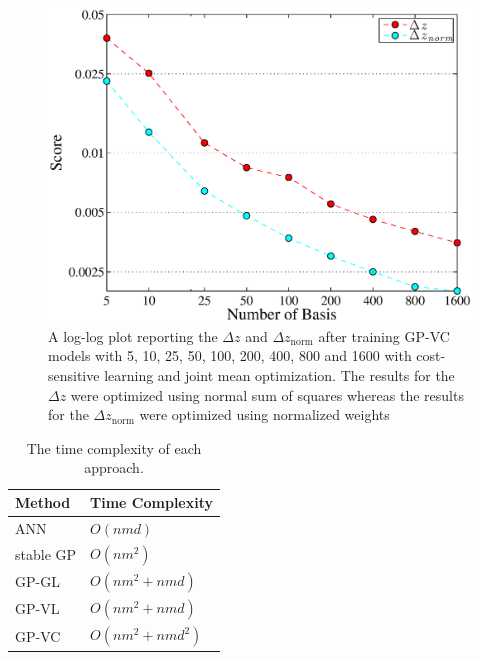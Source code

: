 \documentclass[useAMS,usenatbib,fleqn]{mn2e}
\begin{document}
\begin{figure}
       \centering
       \includegraphics[width=\columnwidth]{figures/1600.eps}
        \caption{A log-log plot reporting the $\Delta z$ and $\Delta z_\textrm{norm}$ after training GP-VC models with 5, 10, 25, 50, 100, 200, 400, 800 and 1600 with cost-sensitive learning and joint mean optimization. The results for the $\Delta z$ were optimized using normal sum of squares whereas the results for the $\Delta z_\textrm{norm}$ were optimized using normalized weights}
       \label{fig-1600}
\end{figure}

\begin{table}
\caption{The time complexity of each approach.}
\begin{center}
  \begin{tabular}{| l | l |}
     	Method		&	Time Complexity					\\	\hline
	ANN			&	$O\left(nmd\right)$					\\
	stable GP		&	$O\left(nm^{2}\right)$				\\
	GP-GL		&	$O\left(nm^{2}+nmd\right)$		\\	
	GP-VL		&	$O\left(nm^{2}+nmd\right)$		\\	
	GP-VC		&	$O\left(nm^{2}+nmd^{2}\right)$	\\	\hline
  \end{tabular}
\end{center}
\label{table-time-complexity}
\end{table}
\end{document}
